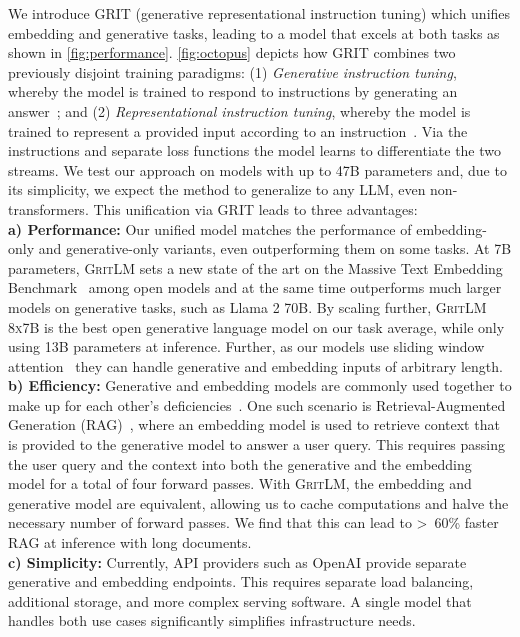 \documentclass{article}
\newcommand{\model}{\textsc{GritLM}}
\newcommand{\method}{\textsc{GRIT}}
\newcommand{\llama}{Llama}
\begin{document}
We introduce \method{} (generative representational instruction tuning) which unifies embedding and generative tasks, leading to a model that excels at both tasks as shown in \autoref{fig:performance}. \autoref{fig:octopus} depicts how \method{} combines two previously disjoint training paradigms: (1) \textit{Generative instruction tuning}, whereby the model is trained to respond to instructions by generating an answer~\cite{wei2022finetuned,sanh2022multitask}; and (2) \textit{Representational instruction tuning}, whereby the model is trained to represent a provided input according to an instruction~\cite{su2023embedder,asai2022taskaware}. Via the instructions and separate loss functions the model learns to differentiate the two streams. We test our approach on models with up to 47B parameters and, due to its simplicity, we expect the method to generalize to any LLM, even non-transformers. This unification via \method{} leads to three advantages:\\
\textbf{a) Performance:} Our unified model matches the performance of embedding-only and generative-only variants, even outperforming them on some tasks. At 7B parameters, \model{} sets a new state of the art on the Massive Text Embedding Benchmark~\cite{muennighoff2023mteb} among open models and at the same time outperforms much larger models on generative tasks, such as \llama{} 2 70B. By scaling further, \model{} \textsc{8x7B} is the best open generative language model on our task average, while only using 13B parameters at inference. Further, as our models use sliding window attention~\cite{child2019generating,beltagy2020longformer} they can handle generative and embedding inputs of arbitrary length.\\
\textbf{b) Efficiency:} Generative and embedding models are commonly used together to make up for each other's deficiencies~\cite{guu2020realm,lewis2021retrievalaugmented}. One such scenario is Retrieval-Augmented Generation (RAG)~\cite{lewis2021retrievalaugmented}, where an embedding model is used to retrieve context that is provided to the generative model to answer a user query. This requires passing the user query and the context into both the generative and the embedding model for a total of four forward passes. With \model{}, the embedding and generative model are equivalent, allowing us to cache computations and halve the necessary number of forward passes. We find that this can lead to >~60\% faster RAG at inference with long documents.\\
\textbf{c) Simplicity:} Currently, API providers such as OpenAI provide separate generative and embedding endpoints. This requires separate load balancing, additional storage, and more complex serving software. A single model that handles both use cases significantly simplifies infrastructure needs.
\end{document}
